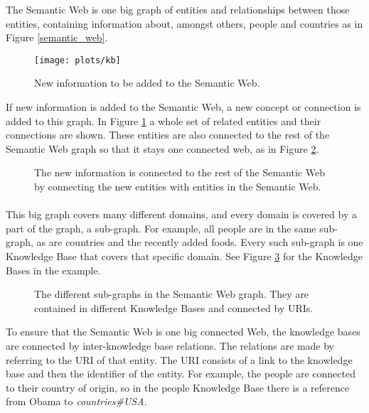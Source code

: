 \documentclass{article}
\begin{document}
 The Semantic Web is one big graph of entities and relationships between those entities, containing information about, amongst others, people and countries as in Figure \ref{semantic_web}.
 
 \begin{figure}[H]
 \centering
 \texttt{[image: plots/kb]}
 \caption[Knowledge Base graph]{New information to be added to the Semantic Web.}
 \label{kb}
 \end{figure}
 
 If new information is added to the Semantic Web, a new concept or connection is added to this graph. In Figure \ref{kb} a whole set of related entities and their connections are shown. These entities are also connected to the rest of the Semantic Web graph so that it stays one connected web, as in Figure \ref{combine}.
 
 \begin{figure}[H]
 \centering
 \caption[Linking the Knowledge Base]{The new information is connected to the rest of the Semantic Web by connecting the new entities with entities in the Semantic Web.}
 \label{combine}
 \end{figure}
 
 \paragraph{}
 This big graph covers many different domains, and every domain is covered by a part of the graph, a sub-graph. For example, all people are in the same sub-graph, as are countries and the recently added foods. Every such sub-graph is one Knowledge Base that covers that specific domain. See Figure \ref{kbs} for the Knowledge Bases in the example.
 
 \begin{figure}[H]
 \centering
 \caption[Semantic Web Knowledge Base view]{The different sub-graphs in the Semantic Web graph. They are contained in different Knowledge Bases and connected by URIs.}
 \label{kbs}
 \end{figure}
 
 To ensure that the Semantic Web is one big connected Web, the knowledge bases are connected by inter-knowledge base relations. The relations are made by referring to the URI of that entity. The URI consists of a link to the knowledge base and then the identifier of the entity. For example, the people are connected to their country of origin, so in the people Knowledge Base there is a reference from Obama to \emph{countries\#USA}.
\end{document}
